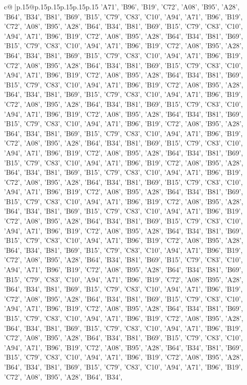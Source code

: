 \documentclass{article}
\begin{document}
{\begin{supertabular}{c@{$\;$}|p{.15\linewidth}@{}p{.15\linewidth}p{.15\linewidth}p{.15\linewidth}p{.15\linewidth}p{.15\linewidth}}
{{{{'A71', 'B96', 'B19', 'C72', 'A08', 'B95', 'A28', 'B64', 'B34', 'B81', 'B69', 'B15', 'C79', 'C83', 'C10', 'A94', 'A71', 'B96', 'B19', 'C72', 'A08', 'B95', 'A28', 'B64', 'B34', 'B81', 'B69', 'B15', 'C79', 'C83', 'C10', 'A94', 'A71', 'B96', 'B19', 'C72', 'A08', 'B95', 'A28', 'B64', 'B34', 'B81', 'B69', 'B15', 'C79', 'C83', 'C10', 'A94', 'A71', 'B96', 'B19', 'C72', 'A08', 'B95', 'A28', 'B64', 'B34', 'B81', 'B69', 'B15', 'C79', 'C83', 'C10', 'A94', 'A71', 'B96', 'B19', 'C72', 'A08', 'B95', 'A28', 'B64', 'B34', 'B81', 'B69', 'B15', 'C79', 'C83', 'C10', 'A94', 'A71', 'B96', 'B19', 'C72', 'A08', 'B95', 'A28', 'B64', 'B34', 'B81', 'B69', 'B15', 'C79', 'C83', 'C10', 'A94', 'A71', 'B96', 'B19', 'C72', 'A08', 'B95', 'A28', 'B64', 'B34', 'B81', 'B69', 'B15', 'C79', 'C83', 'C10', 'A94', 'A71', 'B96', 'B19', 'C72', 'A08', 'B95', 'A28', 'B64', 'B34', 'B81', 'B69', 'B15', 'C79', 'C83', 'C10', 'A94', 'A71', 'B96', 'B19', 'C72', 'A08', 'B95', 'A28', 'B64', 'B34', 'B81', 'B69', 'B15', 'C79', 'C83', 'C10', 'A94', 'A71', 'B96', 'B19', 'C72', 'A08', 'B95', 'A28', 'B64', 'B34', 'B81', 'B69', 'B15', 'C79', 'C83', 'C10', 'A94', 'A71', 'B96', 'B19', 'C72', 'A08', 'B95', 'A28', 'B64', 'B34', 'B81', 'B69', 'B15', 'C79', 'C83', 'C10', 'A94', 'A71', 'B96', 'B19', 'C72', 'A08', 'B95', 'A28', 'B64', 'B34', 'B81', 'B69', 'B15', 'C79', 'C83', 'C10', 'A94', 'A71', 'B96', 'B19', 'C72', 'A08', 'B95', 'A28', 'B64', 'B34', 'B81', 'B69', 'B15', 'C79', 'C83', 'C10', 'A94', 'A71', 'B96', 'B19', 'C72', 'A08', 'B95', 'A28', 'B64', 'B34', 'B81', 'B69', 'B15', 'C79', 'C83', 'C10', 'A94', 'A71', 'B96', 'B19', 'C72', 'A08', 'B95', 'A28', 'B64', 'B34', 'B81', 'B69', 'B15', 'C79', 'C83', 'C10', 'A94', 'A71', 'B96', 'B19', 'C72', 'A08', 'B95', 'A28', 'B64', 'B34', 'B81', 'B69', 'B15', 'C79', 'C83', 'C10', 'A94', 'A71', 'B96', 'B19', 'C72', 'A08', 'B95', 'A28', 'B64', 'B34', 'B81', 'B69', 'B15', 'C79', 'C83', 'C10', 'A94', 'A71', 'B96', 'B19', 'C72', 'A08', 'B95', 'A28', 'B64', 'B34', 'B81', 'B69', 'B15', 'C79', 'C83', 'C10', 'A94', 'A71', 'B96', 'B19', 'C72', 'A08', 'B95', 'A28', 'B64', 'B34', 'B81', 'B69', 'B15', 'C79', 'C83', 'C10', 'A94', 'A71', 'B96', 'B19', 'C72', 'A08', 'B95', 'A28', 'B64', 'B34', 'B81', 'B69', 'B15', 'C79', 'C83', 'C10', 'A94', 'A71', 'B96', 'B19', 'C72', 'A08', 'B95', 'A28', 'B64', 'B34', 'B81', 'B69', 'B15', 'C79', 'C83', 'C10', 'A94', 'A71', 'B96', 'B19', 'C72', 'A08', 'B95', 'A28', 'B64', 'B34', 'B81', 'B69', 'B15', 'C79', 'C83', 'C10', 'A94', 'A71', 'B96', 'B19', 'C72', 'A08', 'B95', 'A28', 'B64', 'B34', 'B81', 'B69', 'B15', 'C79', 'C83', 'C10', 'A94', 'A71', 'B96', 'B19', 'C72', 'A08', 'B95', 'A28', 'B64', 'B34', 'B81', 'B69', 'B15', 'C79', 'C83', 'C10', 'A94', 'A71', 'B96', 'B19', 'C72', 'A08', 'B95', 'A28', 'B64', 'B34', 'B81', 'B69', 'B15', 'C79', 'C83', 'C10', 'A94', 'A71', 'B96', 'B19', 'C72', 'A08', 'B95', 'A28', 'B64', 'B34', 'B81', 'B69', 'B15', 'C79', 'C83', 'C10', 'A94', 'A71', 'B96', 'B19', 'C72', 'A08', 'B95', 'A28', 'B64', 'B34', 'B81', 'B69', 'B15', 'C79', 'C83', 'C10', 'A94', 'A71', 'B96', 'B19', 'C72', 'A08', 'B95', 'A28', 'B64', 'B34', 'B81', 'B69', 'B15', 'C79', 'C83', 'C10', 'A94', 'A71', 'B96', 'B19', 'C72', 'A08', 'B95', 'A28', 'B64', 'B34', }}}}
\end{supertabular}}
\end{document}
